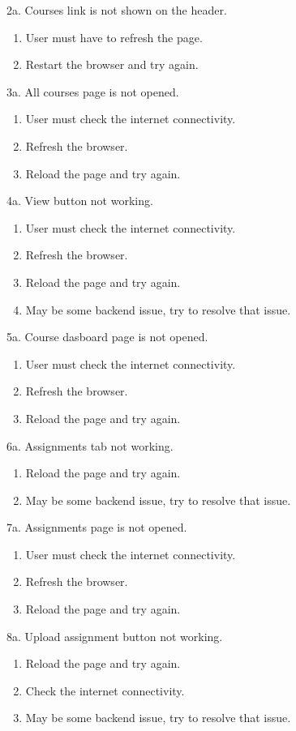 2a. Courses link is not shown on the header.
\begin{enumerate}
\item User must have to refresh the page.
\item Restart the browser and try again.
\end{enumerate} 
3a. All courses page is not opened.
\begin{enumerate}
\item User must check the internet connectivity.
\item Refresh the browser.
\item Reload the page and try again.
\end{enumerate}
4a. View button not working.
\begin{enumerate}
\item User must check the internet connectivity.
\item Refresh the browser.
\item Reload the page and try again.
\item May be some backend issue, try to resolve that issue.
\end{enumerate}
5a. Course dasboard page is not opened.
\begin{enumerate}
\item User must check the internet connectivity.
\item Refresh the browser.
\item Reload the page and try again.
\end{enumerate}
6a. Assignments tab not working.
\begin{enumerate}
\item Reload the page and try again.
\item May be some backend issue, try to resolve that issue.
\end{enumerate}
7a. Assignments page is not opened.
\begin{enumerate}
\item User must check the internet connectivity.
\item Refresh the browser.
\item Reload the page and try again.
\end{enumerate}
8a. Upload assignment button not working.
\begin{enumerate}
\item Reload the page and try again.
\item Check the internet connectivity.
\item May be some backend issue, try to resolve that issue.
\end{enumerate}
